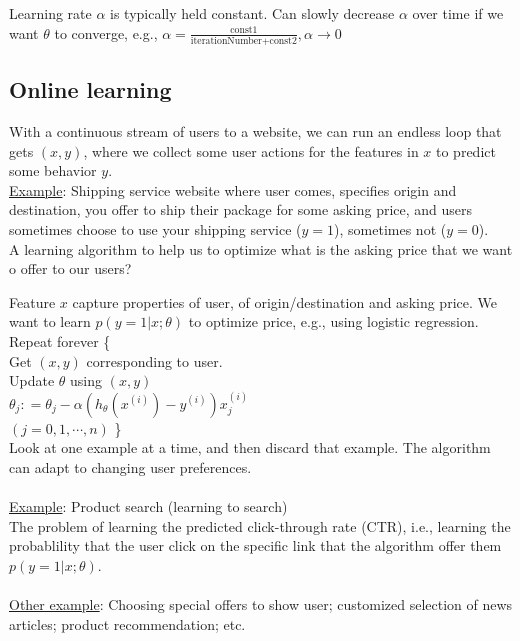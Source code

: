 Learning rate $\alpha$ is typically held constant. Can slowly decrease $\alpha$ over time if we want $\theta$ to converge, e.g., $\alpha = \frac{\text{const1}}{\text{iterationNumber} + \text{const2}}, \alpha \rightarrow 0$

%
\subsection{Online learning}
With a continuous stream of users to a website, we can run an endless loop that gets $(x,y)$, where we collect some user actions for the features in $x$ to predict some behavior $y$.\\
\underline{Example}: Shipping service website where user comes, specifies origin and destination, you offer to ship their package for some asking price, and users sometimes choose to use your shipping service ($y = 1$), sometimes not ($y = 0$).\\

A learning algorithm to help us to optimize what is the asking price that we want o offer to our users?

Feature $x$ capture properties of user, of origin/destination and asking price. We want to learn $p(y = 1 | x; \theta)$ to optimize price, e.g., using logistic regression.\\

Repeat forever \{\\
\indent Get $(x, y)$ corresponding to user.\\
\indent Update $\theta$ using $(x, y)$\\
\indent\indent $\theta_j: = \theta_j - \alpha (h_\theta(x^{(i)}) - y^{(i)}) x_j^{(i)}$\\
\indent\indent $(j = 0, 1, \cdots, n)$ \}\\
Look at one example at a time, and then discard that example. The algorithm can adapt to changing user preferences.
\\\\
\underline{Example}: Product search (learning to search)\\
The problem of learning the predicted click-through rate (CTR), i.e., learning the probablility that the user click on the specific link that the algorithm offer them $p(y = 1 | x; \theta)$.
\\\\
\underline{Other example}: Choosing special offers to show user; customized selection of news articles; product recommendation; etc. 

%
